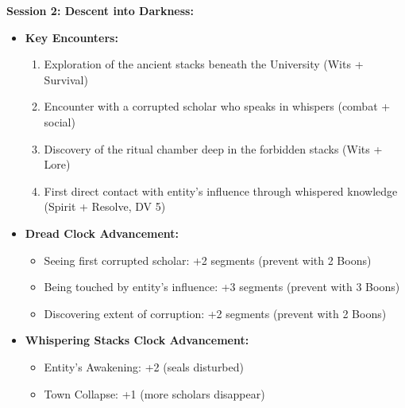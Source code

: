 \documentclass[11pt]{article}
\begin{document}
\textbf{Session 2: Descent into Darkness:}
\begin{itemize}
    \item \textbf{Key Encounters:}
    \begin{enumerate}
        \item Exploration of the ancient stacks beneath the University (Wits + Survival)
        \item Encounter with a corrupted scholar who speaks in whispers (combat + social)
        \item Discovery of the ritual chamber deep in the forbidden stacks (Wits + Lore)
        \item First direct contact with entity's influence through whispered knowledge (Spirit + Resolve, DV 5)
    \end{enumerate}
    \item \textbf{Dread Clock Advancement:}
    \begin{itemize}
        \item Seeing first corrupted scholar: +2 segments (prevent with 2 Boons)
        \item Being touched by entity's influence: +3 segments (prevent with 3 Boons)
        \item Discovering extent of corruption: +2 segments (prevent with 2 Boons)
    \end{itemize}
    \item \textbf{Whispering Stacks Clock Advancement:}
    \begin{itemize}
        \item Entity's Awakening: +2 (seals disturbed)
        \item Town Collapse: +1 (more scholars disappear)
    \end{itemize}
\end{itemize}
\end{document}
